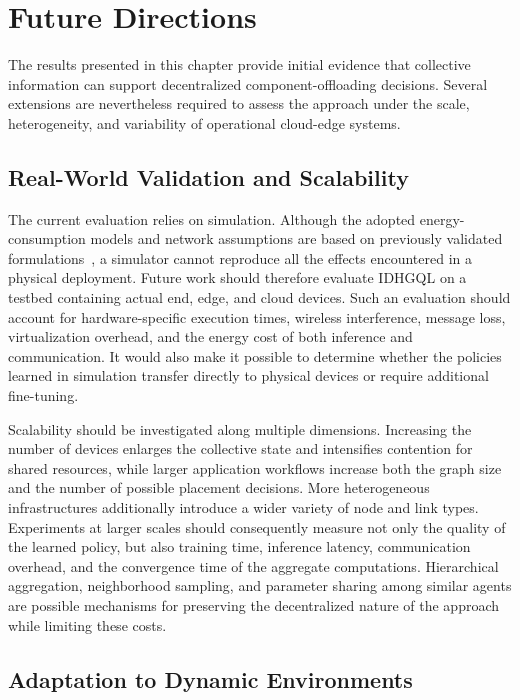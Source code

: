 \section{Future Directions}
\label{sec:ch09-future-directions}

The results presented in this chapter provide initial evidence that collective
information can support decentralized component-offloading decisions.
Several extensions are nevertheless required to assess the approach under the
scale, heterogeneity, and variability of operational cloud-edge systems.

\subsection{Real-World Validation and Scalability}

The current evaluation relies on simulation.
Although the adopted energy-consumption models and network assumptions are based
on previously validated
formulations~\cite{Grochowski2006EnergyPI,DBLP:journals/fgcs/FarabegoliPCV24}, a simulator
cannot reproduce all the effects encountered in a physical deployment.
Future work should therefore evaluate IDHGQL on a testbed containing actual end,
edge, and cloud devices.
Such an evaluation should account for hardware-specific execution times, wireless
interference, message loss, virtualization overhead, and the energy cost of both
inference and communication.
It would also make it possible to determine whether the policies learned in
simulation transfer directly to physical devices or require additional
fine-tuning.

Scalability should be investigated along multiple dimensions.
Increasing the number of devices enlarges the collective state and intensifies
contention for shared resources, while larger application workflows increase both
the graph size and the number of possible placement decisions.
More heterogeneous infrastructures additionally introduce a wider variety of node
and link types.
Experiments at larger scales should consequently measure not only the quality of
the learned policy, but also training time, inference latency, communication
overhead, and the convergence time of the aggregate computations.
Hierarchical aggregation, neighborhood sampling, and parameter sharing among
similar agents are possible mechanisms for preserving the decentralized nature of
the approach while limiting these costs.

\subsection{Adaptation to Dynamic Environments}

